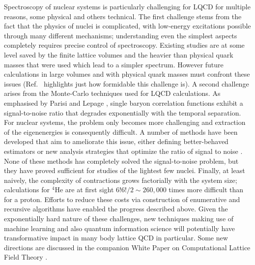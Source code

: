 Spectroscopy of nuclear systems is particularly challenging for LQCD for multiple reasons, some physical and others technical. The first challenge stems from the fact that the physics of nuclei is complicated, with low-energy excitations possible through many different mechanisms; understanding even the simplest aspects completely requires precise control of spectroscopy. Existing studies are at some level saved by the finite lattice volumes and the heavier than physical quark masses that were used which lead to a simpler spectrum. However future calculations in large volumes and with physical quark masses must confront these issues (Ref.~\cite{Beane:2012vq} highlights just how formidable this challenge is).
A second challenge arises from the Monte-Carlo techniques used for LQCD calculations. As emphasised by Parisi and Lepage \cite{Lepage:1989hd,Parisi:1983ae,Hamber:1983vu}, single baryon correlation functions exhibit a signal-to-noise ratio that degrades exponentially with the temporal separation. For nuclear systems, the problem only becomes more challenging \cite{Beane:2009kya,Beane:2009gs} and extraction of the eigenenergies is consequently difficult. A number of methods have been developed that aim to ameliorate this issue, either defining better-behaved estimators \cite{Beane:2014oea,Wagman:2017gqi,Wagman:2017xfh,Wagman:2016bam,Detmold:2018eqd} or new analysis strategies that optimize the ratio of signal to noise \cite{Detmold:2014hla}. None of these methods has completely solved the signal-to-noise problem, but they have proved sufficient for studies of the lightest few nuclei. 
Finally, at least naively, the complexity of contractions grows 
factorially with the system size; calculations for $^4$He are at first sight $6!6!/2\sim 260,000$ times  more difficult than for a proton. Efforts to reduce these costs via construction of enumerative \cite{Doi:2012xd,Gunther:2013xj} and recursive \cite{Detmold:2010au,Detmold:2012eu} algorithms have enabled the progress described above. 
Given the exponentially hard nature of these challenges, new techniques making use of machine learning and also quantum information science will potentially have transformative  impact 
in  many body lattice QCD in particular. Some new directions are discussed in the companion White Paper on Computational Lattice Field Theory \cite{Joo:2019byq}.


